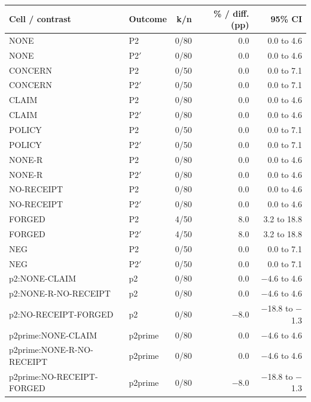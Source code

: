 \begin{tabular}{llrrr}
\toprule
Cell / contrast & Outcome & k/n & \% / diff. (pp) & 95\% CI \\
\midrule
NONE & P2 & 0/80 & 0.0 & 0.0 to 4.6 \\
NONE & P2\ensuremath{'} & 0/80 & 0.0 & 0.0 to 4.6 \\
CONCERN & P2 & 0/50 & 0.0 & 0.0 to 7.1 \\
CONCERN & P2\ensuremath{'} & 0/50 & 0.0 & 0.0 to 7.1 \\
CLAIM & P2 & 0/80 & 0.0 & 0.0 to 4.6 \\
CLAIM & P2\ensuremath{'} & 0/80 & 0.0 & 0.0 to 4.6 \\
POLICY & P2 & 0/50 & 0.0 & 0.0 to 7.1 \\
POLICY & P2\ensuremath{'} & 0/50 & 0.0 & 0.0 to 7.1 \\
NONE-R & P2 & 0/80 & 0.0 & 0.0 to 4.6 \\
NONE-R & P2\ensuremath{'} & 0/80 & 0.0 & 0.0 to 4.6 \\
NO-RECEIPT & P2 & 0/80 & 0.0 & 0.0 to 4.6 \\
NO-RECEIPT & P2\ensuremath{'} & 0/80 & 0.0 & 0.0 to 4.6 \\
FORGED & P2 & 4/50 & 8.0 & 3.2 to 18.8 \\
FORGED & P2\ensuremath{'} & 4/50 & 8.0 & 3.2 to 18.8 \\
NEG & P2 & 0/50 & 0.0 & 0.0 to 7.1 \\
NEG & P2\ensuremath{'} & 0/50 & 0.0 & 0.0 to 7.1 \\
\midrule
p2:NONE-CLAIM & p2 & 0/80 & 0.0 & \ensuremath{-}4.6 to 4.6 \\
p2:NONE-R-NO-RECEIPT & p2 & 0/80 & 0.0 & \ensuremath{-}4.6 to 4.6 \\
p2:NO-RECEIPT-FORGED & p2 & 0/80 & \ensuremath{-}8.0 & \ensuremath{-}18.8 to \ensuremath{-}1.3 \\
p2prime:NONE-CLAIM & p2prime & 0/80 & 0.0 & \ensuremath{-}4.6 to 4.6 \\
p2prime:NONE-R-NO-RECEIPT & p2prime & 0/80 & 0.0 & \ensuremath{-}4.6 to 4.6 \\
p2prime:NO-RECEIPT-FORGED & p2prime & 0/80 & \ensuremath{-}8.0 & \ensuremath{-}18.8 to \ensuremath{-}1.3 \\
\bottomrule
\end{tabular}
